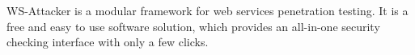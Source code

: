 WS-Attacker is a modular framework for web services penetration testing. It is a free and easy to use software solution, which provides an all-in-one security checking interface with only a few clicks.
